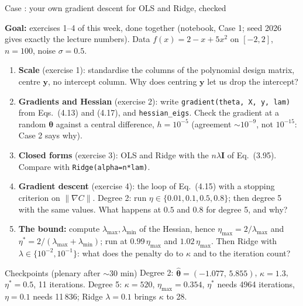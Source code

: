 \documentclass[10pt,aspectratio=169]{beamer}
\newcounter{case}
\newenvironment{case}[1][]{%
  \stepcounter{case}%
  \begin{frame}[fragile,environment=case]{Case \arabic{case}: #1}%
}{\end{frame}}
\begin{document}
\begin{case}[your own gradient descent for OLS and Ridge, checked]
\small
\textbf{Goal:} exercises 1--4 of this week, done together (notebook, Case 1;
seed 2026 gives exactly the lecture numbers).  Data $f(x)=2-x+5x^2$ on
$[-2,2]$, $n=100$, noise $\sigma=0.5$.
\begin{enumerate}
  \item \textbf{Scale} (exercise 1): standardise the columns of the
        polynomial design matrix, centre $\bm{y}$, no intercept column.  Why
        does centring $\bm{y}$ let us drop the intercept?
  \item \textbf{Gradients and Hessian} (exercise 2): write
        \texttt{gradient(theta, X, y, lam)} from Eqs.~(4.13) and (4.17), and
        \texttt{hessian\_eigs}.  Check the gradient at a random
        $\bm{\theta}$ against a central difference, $h=10^{-5}$ (agreement
        $\sim10^{-9}$, not $10^{-15}$: Case 2 says why).
  \item \textbf{Closed forms} (exercise 3): OLS and Ridge with the
        $n\lambda\bm{I}$ of Eq.~(3.95).  Compare with
        \texttt{Ridge(alpha=n*lam)}.
  \item \textbf{Gradient descent} (exercise 4): the loop of Eq.~(4.15) with
        a stopping criterion on $\|\nabla C\|$.  Degree 2: run
        $\eta\in\{0.01,0.1,0.5,0.8\}$; then degree 5 with the same values.
        What happens at $0.5$ and $0.8$ for degree 5, and why?
  \item \textbf{The bound:} compute $\lambda_{\max},\lambda_{\min}$ of the
        Hessian, hence $\eta_{\max}=2/\lambda_{\max}$ and
        $\eta^*=2/(\lambda_{\max}+\lambda_{\min})$; run at $0.99\,\eta_{\max}$
        and $1.02\,\eta_{\max}$.  Then Ridge with $\lambda\in\{10^{-2},10^{-1}\}$:
        what does the penalty do to $\kappa$ and to the iteration count?
\end{enumerate}
\vspace{1pt}
\begin{block}{Checkpoints (plenary after $\sim$30 min)}
Degree 2: $\hat{\bm{\theta}}=(-1.077,\,5.855)$, $\kappa=1.3$, $\eta^*=0.5$,
11 iterations.  Degree 5: $\kappa=520$, $\eta_{\max}=0.354$, $\eta^*$ needs
4964 iterations, $\eta=0.1$ needs 11\,836; Ridge $\lambda=0.1$ brings
$\kappa$ to 28.
\end{block}
\end{case}
\end{document}
